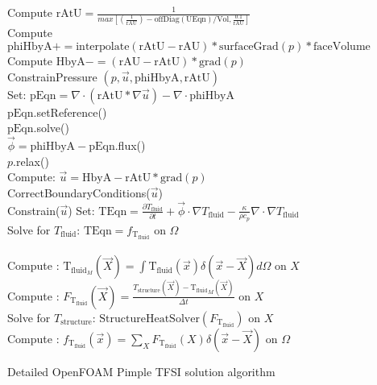 \documentclass[10pt]{article} %
\begin{document}
\begin{algorithm}[H]
{{{				
				{
					Compute $\text{rAtU} =  \frac{1}{max\left[(\frac{1}{\text{rAU}}) - \text{offDiag}(\text{UEqn})/\text{Vol} , \frac{0.1}{\text{rAU}}\right]} $\\
					Compute $\text{phiHbyA} += \text{interpolate}(\text{rAtU}-\text{rAU})*\text{surfaceGrad}(p)*\text{faceVolume}$\\
					Compute $\text{HbyA} -=  \left(\text{rAU}-\text{rAtU}\right)*\text{grad}(p)$\\
				}
				ConstrainPressure $(p,\vec{u},\text{phiHbyA},\text{rAtU})$\\
				{
					Set: $\text{pEqn} = \nabla \cdot \left(\text{rAtU} * \nabla \vec{u}\right)-\nabla \cdot \text{phiHbyA}$\\
					$\text{pEqn}.$setReference()\\
					$\text{pEqn}.$solve()\\
				}
				{
					$\vec{\phi} = \text{phiHbyA} - \text{pEqn}$.flux()\\
				}
				$p.$relax()\\
				Compute: $\vec{u} = \text{HbyA} - \text{rAtU}*\text{grad}(p)$\\
				CorrectBoundaryConditions($\vec{u}$)\\
				Constrain($\vec{u}$)
			}
		}
		{
			Set: $\text{TEqn} = \frac{\partial T_{\text{fluid}}}{\partial t} + \vec{\phi} \cdot \nabla T_{\text{fluid}} - \frac{\kappa}{\rho c_p} \nabla \cdot \nabla T_{\text{fluid}}$\\
			Solve for $T_{\text{fluid}}$: $\text{TEqn} = f_{\text{T}_{\text{fluid}}}$ \quad on $\Omega$\\
			\quad \\
			Compute : $\text{T}_{\text{fluid}_M} (\vec{X}) = \int {\text{T}_{\text{fluid}}}(\vec{x}) \delta(\vec{x}-\vec{X}) d \Omega$  \quad on $X$\\
			Compute : $F_{\text{T}_{\text{fluid}}} (\vec{X}) = \frac{T_{\text{structure}} (\vec{X}) - {\text{T}_{\text{fluid}}}_M(\vec{X})}{\Delta t}$ \quad on $X$\\
			Solve for $T_\text{structure}$: $\text{StructureHeatSolver}(F_{\text{T}_{\text{fluid}}})$ \quad on $X$\\
			Compute : $f_{\text{T}_{\text{fluid}}} (\vec{x}) = \sum_{X} F_{\text{T}_{\text{fluid}}} (X) \delta (\vec{x}-\vec{X})$ \quad on $\Omega$\\
		}
	}
	\caption{Detailed OpenFOAM Pimple TFSI solution algorithm}
\end{algorithm}
\end{document}
